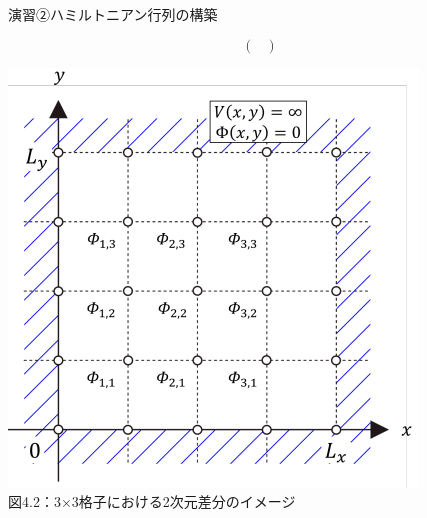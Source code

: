 \documentclass{beamer}
\begin{document}
\begin{frame}{演習②\quad ハミルトニアン行列の構築}
\begin{minipage}{0.5\textwidth}
$$\begin{pmatrix}
    \end{pmatrix}
        $$
  \end{minipage}
  \hfill
  \begin{minipage}{0.36\textwidth}
  \centering
  \includegraphics[width=1\linewidth]{images/二次元.png} \\
  \hspace{0.3em}
  {\scriptsize 図4.2：3×3格子における2次元差分のイメージ}
  \end{minipage}
  \end{frame}
       
\end{document}
